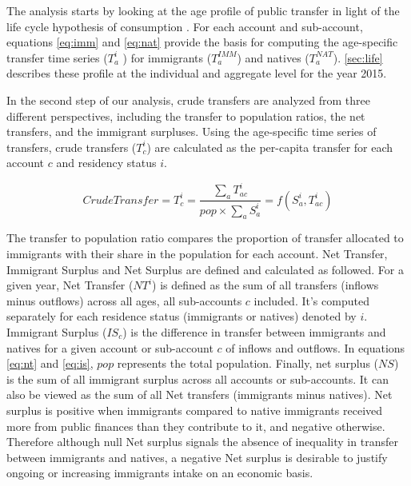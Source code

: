 \vspace{0.7em}\par
The analysis starts by looking at the age profile of public transfer in light of the life cycle hypothesis of consumption \citep{Ando:1963ea,Deaton:2005vr}.
For each account and sub-account, equations \eqref{eq:imm} and \eqref{eq:nat} provide the basis for computing the age-specific transfer time series (\( T^{i}_a \) ) for immigrants (\(T^{IMM}_a\)) and natives (\( T^{NAT}_a \)). \autoref{sec:life} describes these profile at the individual and aggregate level for the year 2015.

\vspace{0.7em}\par
In the second step of our analysis, crude transfers are analyzed from three different perspectives, including the transfer to population ratios, the net transfers, and the immigrant surpluses.
Using the age-specific time series of transfers, crude transfers (\(T^{i}_c \)) are calculated as the per-capita transfer for each account \(c \) and residency status \(i\).

\begin{equation}\label{eq:pc}
  Crude Transfer=T^{i}_c= \frac{\displaystyle\sum_{a}T^{i}_{ac} }{ pop \times \displaystyle\sum_{a} S^{i}_a}=f(S^{i}_a, T^{i}_{ac})
\end{equation}

The transfer to population ratio compares the proportion of transfer allocated to immigrants with their share in the population for each account.
Net Transfer, Immigrant Surplus and Net Surplus are defined and calculated as followed.
For a given year, Net Transfer (\(NT^{i}\)) is defined as the sum of all transfers (inflows minus outflows) across all ages, all sub-accounts \(c \) included.
It's computed separately for each residence status (immigrants or natives) denoted by \(i \).
Immigrant Surplus (\(IS_{c}\)) is the difference in transfer between immigrants and natives for a given account or sub-account \(c \) of inflows and outflows.
In equations \eqref{eq:nt} and \eqref{eq:is}, \( pop \) represents the total population.
Finally, net surplus (\( NS \)) is the sum of all immigrant surplus across all accounts or sub-accounts.
It can also be viewed as the sum of all Net transfers (immigrants minus natives).
Net surplus is positive when immigrants compared to native immigrants received more from public finances than they contribute to it, and negative otherwise.
Therefore although null Net surplus signals the absence of inequality in transfer between immigrants and natives, a negative Net surplus is desirable to justify ongoing or increasing immigrants intake on an economic basis.

